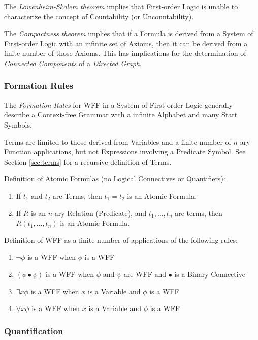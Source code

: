 \documentclass{article}
\begin{document}
The \emph{L\"owenheim-Skolem theorem} implies that First-order Logic
is unable to characterize the concept of Countability (or
Uncountability).

The \emph{Compactness theorem} implies that if a Formula is derived
from a System of First-order Logic with an infinite set of Axioms,
then it can be derived from a finite number of those Axioms. This has
implications for the determination of \emph{Connected Components} of a
\emph{Directed Graph}. %

\subsubsection{Formation Rules}

The \emph{Formation Rules} for WFF in a System of First-order Logic
generally describe a Context-free Grammar with a infinite Alphabet and
many Start Symbols.

Terms are limited to those derived from Variables and a finite number
of $n$-ary Function applications, but not Expressions involving a
Predicate Symbol. See Section \ref{sec:terms} for a recursive
definition of Terms.

Definition of Atomic Formulas (no Logical Connectives or Quantifiers):
\begin{enumerate}
\item If $t_1$ and $t_2$ are Terms, then $t_1 = t_2$ is an Atomic Formula.
\item If $R$ is an $n$-ary Relation (Predicate), and $t_1,\ldots,t_n$
  are terms, then $R(t_1,\ldots,t_n)$ is an Atomic Formula.
\end{enumerate}

Definition of WFF as a finite number of applications of the following rules:
\begin{enumerate}
\item $\neg \phi$ is a WFF when $\phi$ is a WFF
\item $(\phi \bullet \psi)$ is a WFF when $\phi$ and $\psi$ are WFF
  and $\bullet$ is a Binary Connective
\item $\exists x \phi$ is a WFF when $x$ is a Variable and $\phi$ is a WFF
\item $\forall x \phi$ is a WFF when $x$ is a Variable and $\phi$ is a WFF
\end{enumerate}

\subsubsection{Quantification}
\end{document}
